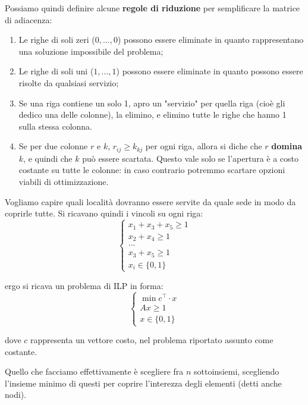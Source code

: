 \documentclass[a4paper,11pt]{article}
\begin{document}
Possiamo quindi definire alcune \textbf{regole di riduzione} per semplificare la  matrice di adiacenza:
\begin{enumerate}
	\item Le righe di soli zeri ($0, ..., 0$) possono essere eliminate in quanto rappresentano una soluzione impossibile del problema;
	\item Le righe di soli uni ($1, ..., 1$) possono essere eliminate in quanto possono essere risolte da qualsiasi servizio; 
	\item Se una riga contiene un solo 1, apro un "servizio" per quella riga (cioè gli dedico una delle colonne), la elimino, e elimino tutte le righe che hanno 1 sulla stessa colonna.
	\item Se per due colonne $r$ e $k$, $r_{ij} \geq k_{kj}$ per ogni riga, allora si diche che $r$ \textbf{domina} $k$, e quindi che $k$ può essere scartata.
		Questo vale solo se l'apertura è a costo costante su tutte le colonne: in caso contrario potremmo scartare opzioni viabili di ottimizzazione. 
\end{enumerate}

	Vogliamo capire quali località dovranno essere servite da quale sede in modo da coprirle tutte. 
Si ricavano quindi i vincoli su ogni riga:
\[
	\begin{cases}
		x_1 + x_3 + x_5 \geq 1 \\
		x_2 + x_4 \geq 1 \\ 
		... \\
		x_3+x_5 \geq 1 \\ 
		x_i \in \{ 0, 1 \}
	\end{cases}
\]

ergo si ricava un problema di ILP in forma:
\[
	\begin{cases}
		\min c^\intercal \cdot x \\ 
		Ax \geq 1 \\ 
		x \in \{ 0, 1 \}
	\end{cases}
\]

dove $c$ rappresenta un vettore costo, nel problema riportato assunto come costante.

Quello che facciamo effettivamente è scegliere fra $n$ sottoinsiemi, scegliendo l'insieme minimo di questi per coprire l'interezza degli elementi (detti anche nodi).
\end{document}
